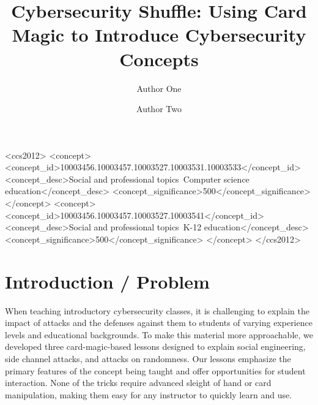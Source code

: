 \documentclass[sigconf]{acmart}
\begin{document}
\title{Cybersecurity Shuffle: Using Card Magic to Introduce Cybersecurity
Concepts}


\author{
  Author One
}

\author{
  Author Two
}




\begin{CCSXML}
<ccs2012>
<concept>
<concept_id>10003456.10003457.10003527.10003531.10003533</concept_id>
<concept_desc>Social and professional topics~Computer science education</concept_desc>
<concept_significance>500</concept_significance>
</concept>
<concept>
<concept_id>10003456.10003457.10003527.10003541</concept_id>
<concept_desc>Social and professional topics~K-12 education</concept_desc>
<concept_significance>500</concept_significance>
</concept>
</ccs2012>
\end{CCSXML}



\maketitle

\section{Introduction / Problem}

When teaching introductory cybersecurity classes,
it is challenging to explain
the impact of attacks and the defenses against them to
students of varying experience levels and educational backgrounds.
To make this material more approachable,
we developed three card-magic-based lessons
designed to explain
social engineering, side channel attacks, and attacks on
randomness.
Our lessons
emphasize the primary
features of the concept being taught
and offer opportunities for student interaction.
None of the tricks require advanced sleight of hand
or card manipulation,
making them easy for any instructor to quickly learn and use.
\end{document}
